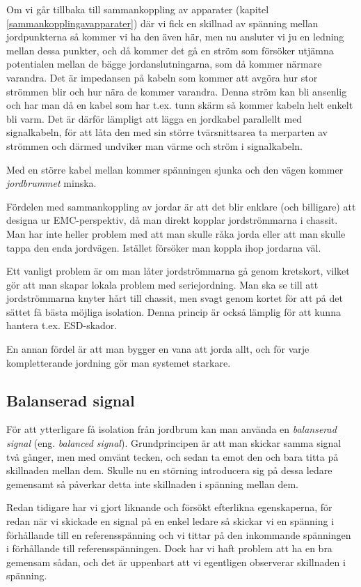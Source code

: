 Om vi går tillbaka till sammankoppling av apparater (kapitel
\ref{sammankopplingavapparater}) där vi fick en skillnad av spänning mellan
jordpunkterna så kommer vi ha den även här, men nu ansluter vi ju en ledning
mellan dessa punkter, och då kommer det gå en ström som försöker utjämna
potentialen mellan de bägge jordanslutningarna, som då kommer närmare varandra.
Det är impedansen på kabeln som kommer att avgöra hur stor strömmen blir och hur
nära de kommer varandra. Denna ström kan bli ansenlig och har man då en kabel
som har t.ex. tunn skärm så kommer kabeln helt enkelt bli varm. Det är därför
lämpligt att lägga en jordkabel parallellt med signalkabeln, för att låta den
med sin större tvärsnittsarea ta merparten av strömmen och därmed undviker man
värme och ström i signalkabeln.

Med en större kabel mellan kommer spänningen sjunka och den vägen kommer
\emph{jordbrummet} minska.

Fördelen med sammankoppling av jordar är att det blir enklare (och billigare)
att designa ur EMC-perspektiv, då man direkt kopplar jordströmmarna i chassit.
Man har inte heller problem med att man skulle råka jorda eller att man skulle
tappa den enda jordvägen. Istället försöker man koppla ihop jordarna väl.

Ett vanligt problem är om man låter jordströmmarna gå genom kretskort, vilket
gör att man skapar lokala problem med seriejordning. Man ska se till att
jordströmmarna knyter hårt till chassit, men svagt genom kortet för att på det
sättet få bästa möjliga isolation. Denna princip är också lämplig för att
kunna hantera t.ex. ESD-skador.

En annan fördel är att man bygger en vana att jorda allt, och för varje
kompletterande jordning gör man systemet starkare.

\subsection{Balanserad signal}

För att ytterligare få isolation från jordbrum kan man använda en
\emph{balanserad signal} (eng. \emph{balanced signal}). Grundprincipen är att
man skickar samma signal två gånger, men med omvänt tecken, och sedan ta emot
den och bara titta på skillnaden mellan dem. Skulle nu en störning introducera
sig på dessa ledare gemensamt så påverkar detta inte skillnaden i spänning
mellan dem.

Redan tidigare har vi gjort liknande och försökt efterlikna
egenskaperna, för redan när vi skickade en signal på en enkel ledare så skickar
vi en spänning i förhållande till en referensspänning och vi tittar på den
inkommande spänningen i förhållande till referensspänningen. Dock har vi haft
problem att ha en bra gemensam sådan, och det är uppenbart att vi egentligen
observerar skillnaden i spänning.

